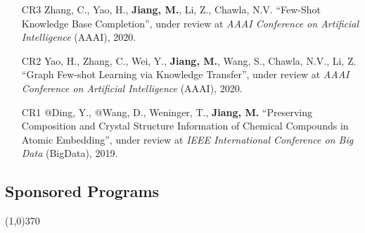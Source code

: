 \documentclass[10pt]{article}
\newenvironment{myindentpar}[1]%
{\begin{list}{}%
         {\setlength{\leftmargin}{#1}}%
         \item[]%
}
{\end{list}}
\newcounter{list}
\begin{document}
\begin{myindentpar}{0.00cm}
\begin{enumerate}[leftmargin=.5cm]
\item[CR3] Zhang, C., Yao, H., \textbf{Jiang, M.}, Li, Z., Chawla, N.V. ``Few-Shot Knowledge Base Completion'', under review at \textit{AAAI Conference on Artificial Intelligence} (AAAI), 2020.

\item[CR2] Yao, H., Zhang, C., Wei, Y., \textbf{Jiang, M.}, Wang, S., Chawla, N.V., Li, Z. ``Graph Few-shot Learning via Knowledge Transfer'', under review at \textit{AAAI Conference on Artificial Intelligence} (AAAI), 2020.
	
\item[CR1] @Ding, Y., @Wang, D., Weninger, T., \textbf{Jiang, M.} ``Preserving Composition and Crystal Structure Information of Chemical Compounds in Atomic Embedding'', under review at \textit{IEEE International Conference on Big Data} (BigData), 2019.

\end{enumerate}


	

\end{myindentpar}

\subsection{\sc Sponsored Programs}
\vspace{-0.4cm} \line(1,0){370} \vspace{-0.1cm}
\end{document}
